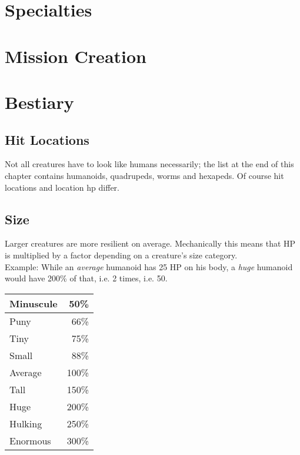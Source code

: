 \documentclass[12pt,a4paper,openany]{book}
\begin{document}
	

	\chapter{Specialties}

	\chapter{Mission Creation}
	

	\chapter{Bestiary}
	\section{Hit Locations}
	Not all creatures have to look like humans necessarily; the list at the end of this chapter contains humanoids, quadrupeds, worms and hexapeds. Of course hit locations and location hp differ.
	

	\section{Size}
	Larger creatures are more resilient on average. Mechanically this means that HP is multiplied by a factor depending on a creature's size category.\\
	Example: While an \emph{average} humanoid has 25 HP on his body, a \emph{huge} humanoid would have 200\% of that, i.e. 2 times, i.e. 50.
	\begin{tabularx}{\textwidth}{|l|r|}
		\hline
		Minuscule &  50\% \\ \hline
		Puny      &  66\% \\ \hline
		Tiny      &  75\% \\ \hline
		Small     &  88\% \\ \hline
		Average   & 100\% \\ \hline
		Tall      & 150\% \\ \hline
		Huge      & 200\% \\ \hline
		Hulking   & 250\% \\ \hline
		Enormous  & 300\% \\ \hline
	\end{tabularx}
\end{document}
